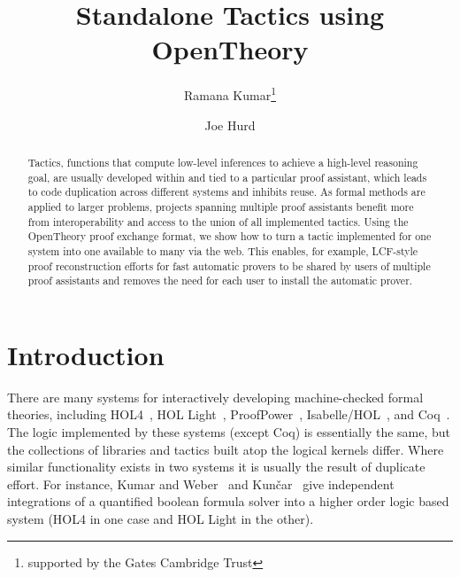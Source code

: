 \documentclass{llncs}
\begin{document}
\title{Standalone Tactics using OpenTheory}

\author{Ramana Kumar\thanks{supported by the Gates Cambridge Trust}\and Joe Hurd}


\maketitle

\begin{abstract}
Tactics, functions that compute low-level inferences to achieve a high-level reasoning goal, are usually developed within and tied to a particular proof assistant, which leads to code duplication across different systems and inhibits reuse.
As formal methods are applied to larger problems, projects spanning multiple proof assistants benefit more from interoperability and access to the union of all implemented tactics.
Using the OpenTheory proof exchange format, we show how to turn a tactic implemented for one system into one available to many via the web.
This enables, for example, LCF-style proof reconstruction efforts for fast automatic provers to be shared by users of multiple proof assistants and removes the need for each user to install the automatic prover.
\end{abstract}

\section{Introduction}
There are many systems for interactively developing machine-checked formal theories, including HOL4~\cite{slind08brief}, HOL Light~\cite{DBLP:conf/tphol/Harrison09a}, ProofPower~\cite{ProofPower}, Isabelle/HOL~\cite{wenzel08isabelle}, and Coq~\cite{bertot08short}.
The logic implemented by these systems (except Coq) is essentially the same, but the collections of libraries and tactics built atop the logical kernels differ.
Where similar functionality exists in two systems it is usually the result of duplicate effort.
For instance, Kumar and Weber~\cite{DBLP:conf/itp/KumarW11} and Kun\v{c}ar~\cite{DBLP:conf/itp/Kuncar11} give independent integrations of a quantified boolean formula solver into a higher order logic based system (HOL4 in one case and HOL Light in the other).
\end{document}
